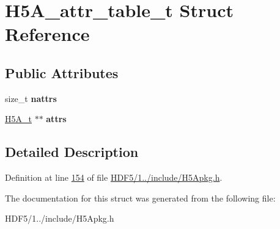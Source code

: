 \hypertarget{struct_h5_a__attr__table__t}{}\section{H5\+A\+\_\+attr\+\_\+table\+\_\+t Struct Reference}
\label{struct_h5_a__attr__table__t}
\subsection*{Public Attributes}
\begin{DoxyCompactItemize}
\item 
\mbox{\label{struct_h5_a__attr__table__t_a53487b629cb4615a5784f6528ee29d6d}} 
size\+\_\+t {\bfseries nattrs}
\item 
\mbox{\label{struct_h5_a__attr__table__t_a45b2ac4eab9f728dc82293b162026508}} 
\hyperlink{struct_h5_a__t}{H5\+A\+\_\+t} $\ast$$\ast$ {\bfseries attrs}
\end{DoxyCompactItemize}


\subsection{Detailed Description}


Definition at line \hyperlink{_h_d_f5_21_810_81_2include_2_h5_apkg_8h_source_l00154}{154} of file \hyperlink{_h_d_f5_21_810_81_2include_2_h5_apkg_8h_source}{H\+D\+F5/1../include/\+H5\+Apkg.\+h}.



The documentation for this struct was generated from the following file\+:\begin{DoxyCompactItemize}
\item 
H\+D\+F5/1../include/\+H5\+Apkg.\+h\end{DoxyCompactItemize}
